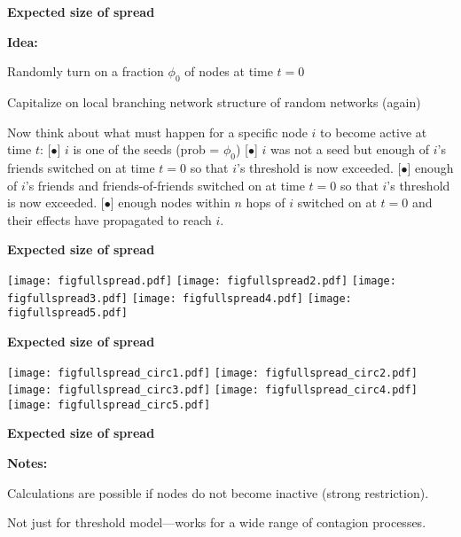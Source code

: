 {{{{  


  \textbf{Expected size of spread}

  \textbf{Idea:}
    
     
      Randomly turn on a fraction $\phi_0$ of nodes at time $t=0$
     
      Capitalize on local branching network structure of random
      networks (again)
     
      Now think about what must happen for
      a specific node $i$ to become active at time $t$:
    [$\bullet$]
       $i$ is one of the seeds (prob = $\phi_0$)
    [$\bullet$]
       $i$ was not a seed but enough of $i$'s friends switched
      on at time $t=0$ so that $i$'s threshold is now exceeded.
    [$\bullet$] 
       enough of $i$'s friends and friends-of-friends switched
      on at time $t=0$ so that $i$'s threshold is now exceeded.
    [$\bullet$] 
       enough nodes within $n$ hops of $i$ 
      switched on at $t=0$ and their effects have propagated to reach $i$.
    
  



  \textbf{Expected size of spread}

  \texttt{[image: figfullspread.pdf]}
  \texttt{[image: figfullspread2.pdf]}
  \texttt{[image: figfullspread3.pdf]}
  \texttt{[image: figfullspread4.pdf]}
  \texttt{[image: figfullspread5.pdf]}


  \textbf{Expected size of spread}

  \texttt{[image: figfullspread\_circ1.pdf]}
  \texttt{[image: figfullspread\_circ2.pdf]}
  \texttt{[image: figfullspread\_circ3.pdf]}
  \texttt{[image: figfullspread\_circ4.pdf]}
  \texttt{[image: figfullspread\_circ5.pdf]}



  \textbf{Expected size of spread}

  \textbf{Notes:}
    
     
      Calculations are possible
      if nodes do not become inactive (strong restriction).
    
      Not just for threshold model---works
      for a wide range of contagion processes.
    
}}}}
